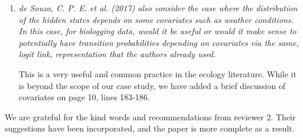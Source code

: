 \documentclass{article}
\begin{document}
\begin{enumerate}
    \item \textit{de Souza, C. P. E. et al. (2017) also consider the case where the distribution of the hidden states depends on some covariates such as weather conditions. In this case, for biologging data, would it be useful or would it make sense to potentially have transition probabilities depending on covariates via the same, logit link, representation that the authors already used.}
    
    This is a very useful and common practice in the ecology literature. While it is beyond the scope of our case study, we have added a brief discussion of covariates on page 10, lines 183-186.
    
\end{enumerate}

We are grateful for the kind words and recommendations from reviewer 2. Their suggestions have been incorporated, and the paper is more complete as a result.
\end{document}
